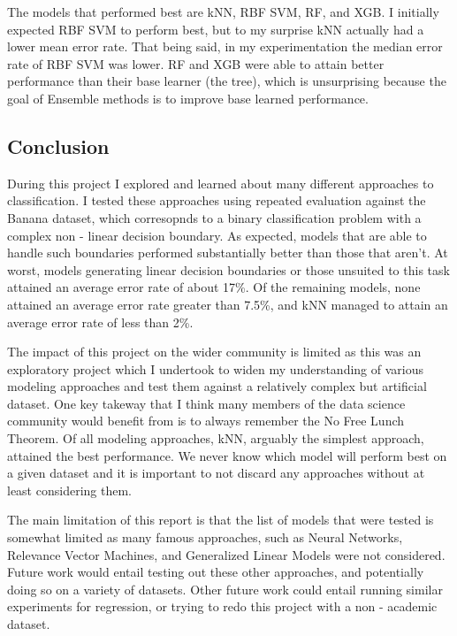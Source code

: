 \documentclass[
]{article}
\begin{document}
The models that performed best are kNN, RBF SVM, RF, and XGB. I
initially expected RBF SVM to perform best, but to my surprise kNN
actually had a lower mean error rate. That being said, in my
experimentation the median error rate of RBF SVM was lower. RF and XGB
were able to attain better performance than their base learner (the
tree), which is unsurprising because the goal of Ensemble methods is to
improve base learned performance.

\hypertarget{conclusion}{%
\subsection{Conclusion}\label{conclusion}}

During this project I explored and learned about many different
approaches to classification. I tested these approaches using repeated
evaluation against the Banana dataset, which corresopnds to a binary
classification problem with a complex non - linear decision boundary. As
expected, models that are able to handle such boundaries performed
substantially better than those that aren't. At worst, models generating
linear decision boundaries or those unsuited to this task attained an
average error rate of about 17\%. Of the remaining models, none attained
an average error rate greater than 7.5\%, and kNN managed to attain an
average error rate of less than 2\%.

The impact of this project on the wider community is limited as this was
an exploratory project which I undertook to widen my understanding of
various modeling approaches and test them against a relatively complex
but artificial dataset. One key takeway that I think many members of the
data science community would benefit from is to always remember the No
Free Lunch Theorem. Of all modeling approaches, kNN, arguably the
simplest approach, attained the best performance. We never know which
model will perform best on a given dataset and it is important to not
discard any approaches without at least considering them.

The main limitation of this report is that the list of models that were
tested is somewhat limited as many famous approaches, such as Neural
Networks, Relevance Vector Machines, and Generalized Linear Models were
not considered. Future work would entail testing out these other
approaches, and potentially doing so on a variety of datasets. Other
future work could entail running similar experiments for regression, or
trying to redo this project with a non - academic dataset.
\end{document}
